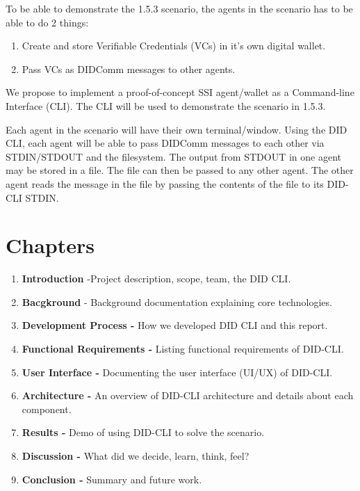 To be able to demonstrate the 1.5.3 scenario, the agents in the scenario
has to be able to do 2 things:

\begin{enumerate}
\def\labelenumi{\arabic{enumi}.}
\tightlist
\item
  Create and store Verifiable Credentials (VCs) in it's own digital
  wallet.
\item
  Pass VCs as DIDComm messages to other agents.
\end{enumerate}

We propose to implement a proof-of-concept SSI agent/wallet as a
Command-line Interface (CLI). The CLI will be used to demonstrate the
scenario in 1.5.3.

Each agent in the scenario will have their own terminal/window. Using
the DID CLI, each agent will be able to pass DIDComm messages to each
other via STDIN/STDOUT and the filesystem. The output from STDOUT in one agent may be
stored in a file. The file can then be passed to any other agent. The
other agent reads the message in the file by passing the contents of the
file to its DID-CLI STDIN.

\hypertarget{chapters}{%
\section{Chapters}\label{chapters}}

\begin{enumerate}
\def\labelenumi{\arabic{enumi}.}
\tightlist
\item
  \textbf{Introduction} -Project description, scope, team, the DID CLI.
\item
  \textbf{Bacgkround} - Background documentation explaining core technologies.
\item
  \textbf{Development Process -} How we developed DID CLI and this
  report.
\item
  \textbf{Functional Requirements -} Listing functional requirements of DID-CLI.
\item
  \textbf{User Interface -} Documenting the user interface (UI/UX) of DID-CLI.
\item
  \textbf{Architecture -} An overview of DID-CLI architecture and details about each component.
\item
  \textbf{Results -} Demo of using DID-CLI to solve the scenario.
\item
  \textbf{Discussion -} What did we decide, learn, think, feel?
\item
  \textbf{Conclusion -} Summary and future work.
\end{enumerate}
